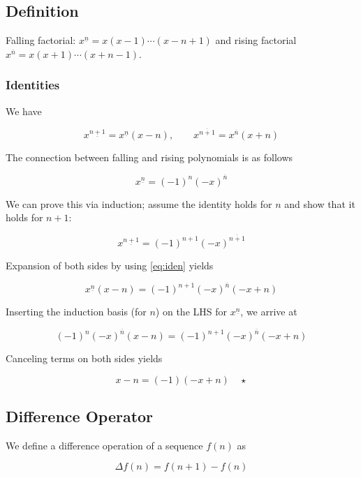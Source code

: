 
\subsection{Definition}

Falling factorial: $x^{\underline{n}} = x(x-1)\cdots(x-n+1)$ and rising factorial $x^{\overline{n}} = x(x+1)\cdots(x+n-1)$.

\subsubsection{Identities}

We have

\begin{equation}
\label{eq:iden}
x^{\underline{n+1}} = x^{\underline{n}} (x-n), \qquad x^{\overline{n+1}} = x^{\overline{n}} (x+n)
\end{equation}

The connection between falling and rising polynomials is as follows

\begin{equation}
x^{\underline{n}} = (-1)^n (-x)^{\overline{n}}
\end{equation}

We can prove this via induction; assume the identity holds for
$n$ and show that it holds for $n+1$:

\[x^{\underline{n+1}} = (-1)^{n+1} (-x)^{\overline{n+1}}\]

Expansion of both sides by using \eqref{eq:iden} yields

\[x^{\underline{n}}(x-n) = (-1)^{n+1} (-x)^{\overline{n}}(-x+n)\]

Inserting the induction basis (for $n$) on the LHS for $x^{\underline{n}}$, we arrive at

\[ (-1)^n (-x)^{\overline{n}} (x-n) = (-1)^{n+1} (-x)^{\overline{n}}(-x+n)\]

Canceling terms on both sides yields

\[ x-n = (-1)(-x+n) \quad \star\]

\subsection{Difference Operator}

We define a difference operation of a sequence $f(n)$ as

\begin{equation}
\Delta f(n) = f(n+1) - f(n)
\end{equation}

